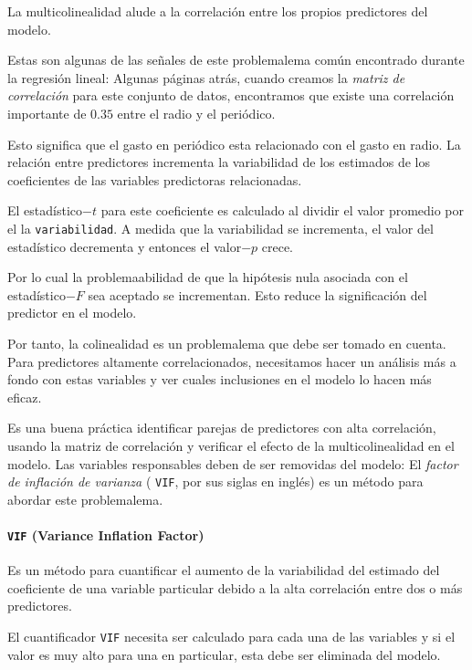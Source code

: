 La multicolinealidad alude a la correlación entre los propios predictores del modelo.


Estas son algunas de las señales de este problemalema común encontrado durante la regresión lineal:  Algunas páginas atrás, cuando creamos la \emph{matriz de correlación} para este conjunto de datos, encontramos que existe una correlación importante de $0.35$ entre el radio y el periódico.

Esto significa que el gasto en periódico esta relacionado con el gasto en radio. La relación entre predictores incrementa la variabilidad de los estimados de los coeficientes de las variables predictoras relacionadas.


El estadístico$-t$ para este coeficiente es calculado al dividir el valor promedio por el la \texttt{variabilidad}.  A medida que la variabilidad se incrementa, el valor del estadístico decrementa y entonces el valor$-p$ crece. 

Por lo cual la problemaabilidad de que la hipótesis nula asociada con el estadístico$-F$ sea aceptado se incrementan. Esto reduce la significación del predictor en el modelo.


Por tanto, la colinealidad es un problemalema que debe ser tomado en cuenta.  Para predictores altamente correlacionados, necesitamos hacer un análisis más a fondo con estas variables y ver cuales inclusiones en el modelo lo hacen más eficaz.


Es una buena práctica identificar parejas de predictores con alta correlación, usando la matriz de correlación y verificar el efecto de la multicolinealidad en el modelo.  Las variables responsables deben de ser removidas del modelo: El \emph{factor de inflación de varianza} ( \texttt{VIF}, por sus siglas en inglés) es un método para abordar este problemalema.

\paragraph{\texttt{VIF} (Variance Inflation Factor)}
Es un método para cuantificar el aumento de la variabilidad del estimado del coeficiente de una variable particular debido a la alta correlación entre dos o más predictores.


El cuantificador \texttt{VIF} necesita ser calculado para cada una de las variables y si el valor es muy alto para una en particular, esta debe ser eliminada del modelo.


